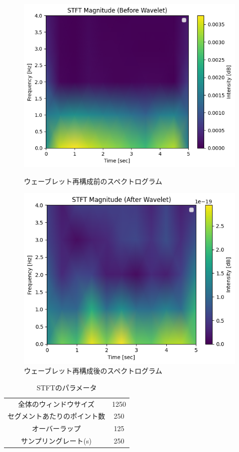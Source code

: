 \documentclass[dvipdfmx]{jsarticle}
\begin{document}
\begin{figure}[htbp]
    \begin{minipage}[c]{0.5\hsize}
      \centering
      \includegraphics[width=\linewidth]{./img/stft_before.png}
      \caption{ウェーブレット再構成前のスペクトログラム}
    \end{minipage}
    \begin{minipage}[c]{0.5\hsize}
      \centering
      \includegraphics[width=\linewidth]{./img/stft_after.png}
      \caption{ウェーブレット再構成後のスペクトログラム}
    \end{minipage}
\end{figure}

\begin{table}[H]
    \caption{STFTのパラメータ}
    \centering
    \begin{tabular}{cc}
    \hline
    全体のウィンドウサイズ & 1250 \\
    セグメントあたりのポイント数 & 250 \\
    オーバーラップ & 125 \\
    サンプリングレート(s) & 250 \\
    \hline
    \end{tabular}
\end{table}
\end{document}
